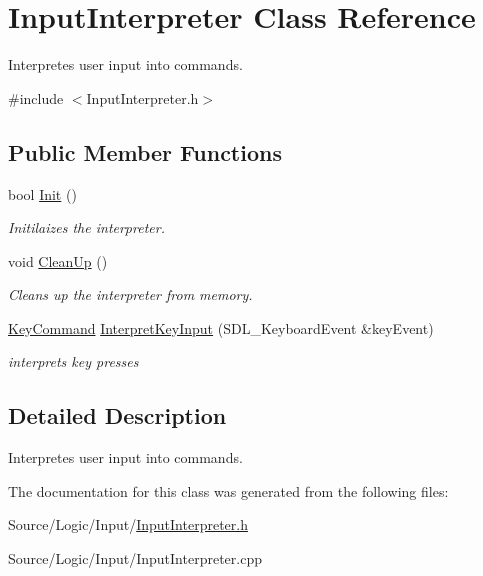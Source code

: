 \hypertarget{class_input_interpreter}{}\section{Input\+Interpreter Class Reference}
\label{class_input_interpreter}


Interpretes user input into commands.  




{\ttfamily \#include $<$Input\+Interpreter.\+h$>$}

\subsection*{Public Member Functions}
\begin{DoxyCompactItemize}
\item 
\mbox{\label{class_input_interpreter_a0a763fbc159f1a3841d0c496a7608b74}} 
bool \mbox{\hyperlink{class_input_interpreter_a0a763fbc159f1a3841d0c496a7608b74}{Init}} ()
\begin{DoxyCompactList}\small\item\em Initilaizes the interpreter. \end{DoxyCompactList}\item 
\mbox{\label{class_input_interpreter_a8d78a3a9a91561a4dbd67f5b301b25cf}} 
void \mbox{\hyperlink{class_input_interpreter_a8d78a3a9a91561a4dbd67f5b301b25cf}{Clean\+Up}} ()
\begin{DoxyCompactList}\small\item\em Cleans up the interpreter from memory. \end{DoxyCompactList}\item 
\mbox{\label{class_input_interpreter_a9a1a36c64d4bfbe69fb98abcfe731c62}} 
\mbox{\hyperlink{class_key_command}{Key\+Command}} \mbox{\hyperlink{class_input_interpreter_a9a1a36c64d4bfbe69fb98abcfe731c62}{Interpret\+Key\+Input}} (S\+D\+L\+\_\+\+Keyboard\+Event \&key\+Event)
\begin{DoxyCompactList}\small\item\em interprets key presses \end{DoxyCompactList}\end{DoxyCompactItemize}


\subsection{Detailed Description}
Interpretes user input into commands. 

The documentation for this class was generated from the following files\+:\begin{DoxyCompactItemize}
\item 
Source/\+Logic/\+Input/\mbox{\hyperlink{_input_interpreter_8h}{Input\+Interpreter.\+h}}\item 
Source/\+Logic/\+Input/Input\+Interpreter.\+cpp\end{DoxyCompactItemize}
